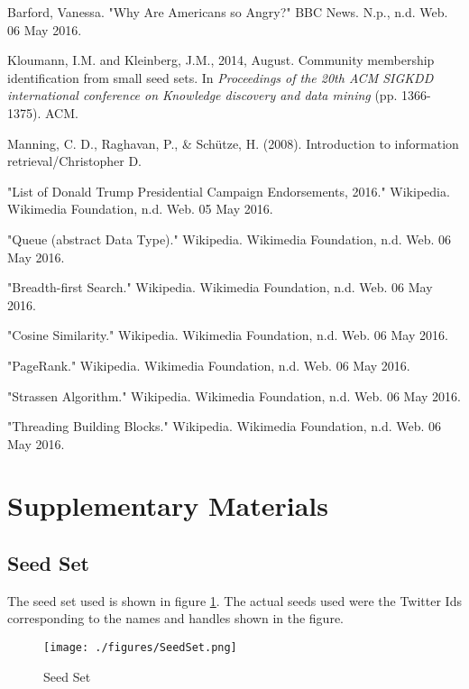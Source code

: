 \documentclass{sig-alternate-05-2015}
\begin{document}
\begin{thebibliography}{1}

Barford, Vanessa. "Why Are Americans so Angry?" BBC News. N.p., n.d. Web. 06 May 2016.

Kloumann, I.M. and Kleinberg, J.M., 2014, August. Community membership identification from small seed sets. In \emph{Proceedings of the 20th ACM SIGKDD international conference on Knowledge discovery and data mining} (pp. 1366-1375). ACM.

Manning, C. D., Raghavan, P., \& Sch\"utze, H. (2008). Introduction to information retrieval/Christopher D.

"List of Donald Trump Presidential Campaign Endorsements, 2016." Wikipedia. Wikimedia Foundation, n.d. Web. 05 May 2016.

"Queue (abstract Data Type)." Wikipedia. Wikimedia Foundation, n.d. Web. 06 May 2016.

"Breadth-first Search." Wikipedia. Wikimedia Foundation, n.d. Web. 06 May 2016.

"Cosine Similarity." Wikipedia. Wikimedia Foundation, n.d. Web. 06 May 2016.

"PageRank." Wikipedia. Wikimedia Foundation, n.d. Web. 06 May 2016.

"Strassen Algorithm." Wikipedia. Wikimedia Foundation, n.d. Web. 06 May 2016.

"Threading Building Blocks." Wikipedia. Wikimedia Foundation, n.d. Web. 06 May 2016.

\end{thebibliography}

\section{Supplementary Materials}
\subsection{Seed Set}
\label{sssec:num1} 
The seed set used is shown in figure \ref{SeedSetTable}. The actual seeds used were the Twitter Ids corresponding to the names and handles shown in the figure.
\begin{figure}[!t]
\centering
\texttt{[image: ./figures/SeedSet.png]}
\caption{Seed Set}
\label{SeedSetTable}
\end{figure}
%
%
%
%

\end{document}
